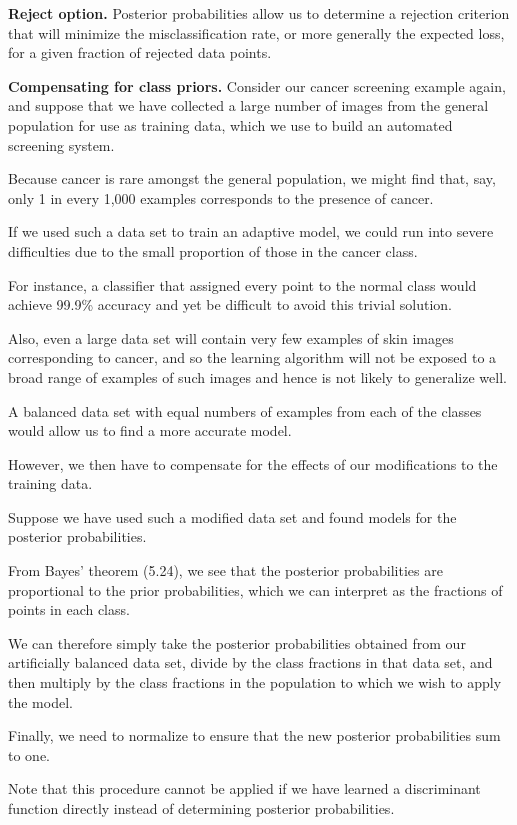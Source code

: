 \documentclass{article}
\begin{document}
\textbf{Reject option.} Posterior probabilities allow us to determine a rejection criterion that will minimize the misclassification rate, or more generally the expected loss, for a given fraction of rejected data points.

\textbf{Compensating for class priors.} Consider our cancer screening example again, and suppose that we have collected a large number of images from the general population for use as training data, which we use to build an automated screening system. 

Because cancer is rare amongst the general population, we might find that, say, only 1 in every 1,000 examples corresponds to the presence of cancer. 

If we used such a data set to train an adaptive model, we could run into severe difficulties due to the small proportion of those in the cancer class. 

For instance, a classifier that assigned every point to the normal class would achieve 99.9\% accuracy and yet be difficult to avoid this trivial solution. 

Also, even a large data set will contain very few examples of skin images corresponding to cancer, and so the learning algorithm will not be exposed to a broad range of examples of such images and hence is not likely to generalize well. 

A balanced data set with equal numbers of examples from each of the classes would allow us to find a more accurate model. 

However, we then have to compensate for the effects of our modifications to the training data. 

Suppose we have used such a modified data set and found models for the posterior probabilities. 

From Bayes' theorem (5.24), we see that the posterior probabilities are proportional to the prior probabilities, which we can interpret as the fractions of points in each class. 

We can therefore simply take the posterior probabilities obtained from our artificially balanced data set, divide by the class fractions in that data set, and then multiply by the class fractions in the population to which we wish to apply the model. 

Finally, we need to normalize to ensure that the new posterior probabilities sum to one. 

Note that this procedure cannot be applied if we have learned a discriminant function directly instead of determining posterior probabilities.
\end{document}
